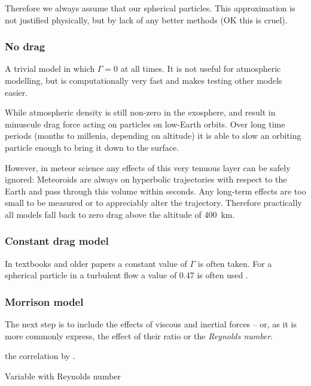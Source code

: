         Therefore we always assume that our spherical particles.
        This approximation is not justified physically, but by lack of any better methods (OK this is cruel).

        \subsubsection{No drag} \label{mdn}
            A trivial model in which $\Gamma = 0$ at all times.
            It is not useful for atmospheric modelling, but is computationally
            very fast and makes testing other models easier.

            While atmospheric density is still non-zero in the exosphere,
            and result in minuscule drag force acting on particles on low-Earth orbits.
            Over long time periods (months to millenia, depending on altitude) it is able to slow
            an orbiting particle enough to bring it down to the surface.

            However, in meteor science any effects of this very tenuous layer can be safely ignored:
            Meteoroids are always on hyperbolic trajectories with respect to the Earth
            and pass through this volume within seconds. Any long-term effects
            are too small to be measured or to appreciably alter the trajectory.
            Therefore practically all models fall back to zero drag above the altitude of \SI{400}{\kilo\metre}.

        \subsubsection{Constant drag model} \label{mdc}
            In textbooks and older papers a constant value of $\Gamma$ is often taken.
            For a spherical particle in a turbulent flow a value of \num{0.47}
            is often used \cite{???}. \cite{hrábek} \cite{havrila}

        \subsubsection{Morrison model} \label{mdM}
            The next step is to include the effects of viscous and inertial forces -- or,
            as it is more commonly express, the effect of their ratio or the \emph{Reynolds number}.

            the correlation by \citet{morrison2016}.

            Variable with Reynolds number


